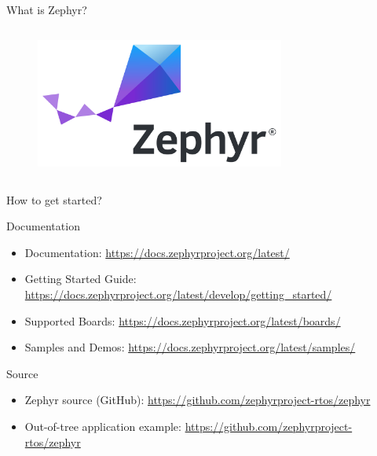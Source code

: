 \documentclass[10pt, aspectratio=169]{beamer}
\begin{document}
\begin{frame}[fragile]{What is Zephyr?}
\begin{columns}
    \begin{column}{0.4\textwidth}
      \begin{figure}
        \includegraphics[width=0.73\textwidth]{images/zephyr_logo.png}
      \end{figure}
    \end{column}

  \end{columns}
\end{frame}

\begin{frame}[fragile]{How to get started?}

  \begin{block}{Documentation}
    \begin{itemize}
      \item Documentation: {\scriptsize \url{https://docs.zephyrproject.org/latest/}}
      \item Getting Started Guide: {\scriptsize \url{https://docs.zephyrproject.org/latest/develop/getting_started/}}
      \item Supported Boards: {\scriptsize \url{https://docs.zephyrproject.org/latest/boards/}}
      \item Samples and Demos: {\scriptsize \url{https://docs.zephyrproject.org/latest/samples/}}
    \end{itemize}
  \end{block}
  \begin{block}{Source}
    \begin{itemize}
      \item Zephyr source (GitHub): {\scriptsize \url{https://github.com/zephyrproject-rtos/zephyr}}
      \item Out-of-tree application example: {\scriptsize \url{https://github.com/zephyrproject-rtos/zephyr}}
    \end{itemize}
  \end{block}
\end{frame}

\end{document}
